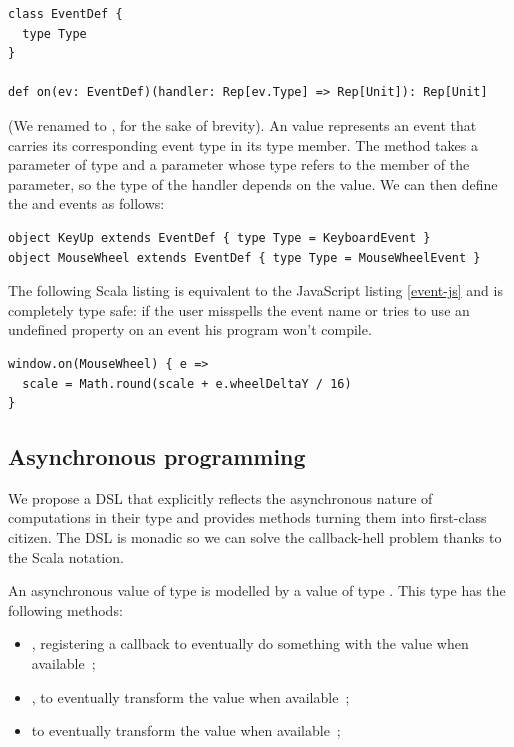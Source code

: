 \documentclass[american,english,runningheads]{llncs}
\begin{document}
\begin{lstlisting}
class EventDef {
  type Type
}

def on(ev: EventDef)(handler: Rep[ev.Type] => Rep[Unit]): Rep[Unit]
\end{lstlisting}

(We renamed  to , for the sake of brevity). An  value represents an event that carries its corresponding event type in its  type member. The  method takes a parameter  of type  and a  parameter whose type refers to the  member of the  parameter, so the type of the handler depends on the  value. We can then define the  and  events as follows:

\begin{lstlisting}
object KeyUp extends EventDef { type Type = KeyboardEvent }
object MouseWheel extends EventDef { type Type = MouseWheelEvent }
\end{lstlisting}

The following Scala listing is equivalent to the JavaScript listing \ref{event-js} and is completely type safe: if the user misspells the event name or tries to use an undefined property on an event his program won’t compile.

\begin{lstlisting}
window.on(MouseWheel) { e =>
  scale = Math.round(scale + e.wheelDeltaY / 16)
}
\end{lstlisting}

\subsection{Asynchronous programming}

We propose a DSL that explicitly reflects the asynchronous nature of computations in their type and provides methods turning them into first-class citizen. The DSL is monadic so we can solve the callback-hell problem thanks to the Scala  notation.

An asynchronous value of type  is modelled by a value of type . This type has the following methods:
\begin{itemize}
\item {}, registering a callback to eventually do something with the value when available~;
\item {}, to eventually transform the value when available~;
\item {} to eventually transform the value when available~;
\end{itemize}
\end{document}
